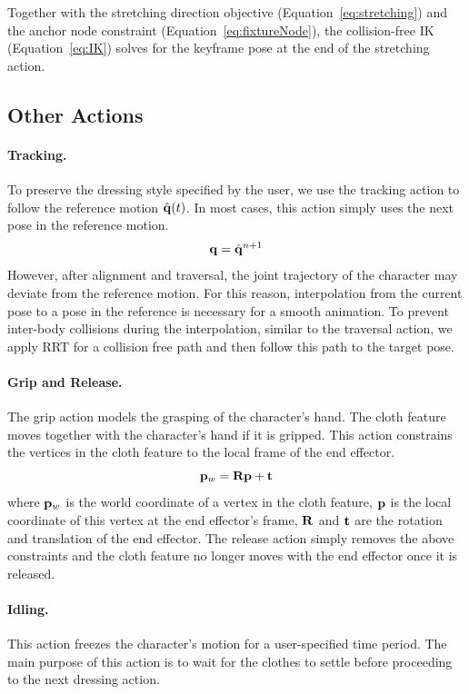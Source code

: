 Together with the stretching direction objective (Equation~\ref{eq:stretching}) and the anchor node constraint (Equation~\ref{eq:fixtureNode}), the collision-free IK (Equation~\ref{eq:IK}) solves for the keyframe pose at the end of the stretching action.

\subsection{Other Actions}

\paragraph{Tracking.} To preserve the dressing style specified by the user, we use the tracking action to follow the reference motion $\hat{\mathbf{q}}(t)$. In most cases, this action simply uses the next pose in the reference motion.
\begin{displaymath}
\mathbf{q} = \hat{\mathbf{q}}^{n+1}
\end{displaymath}
However, after alignment and traversal, the joint trajectory of the character may deviate from the reference motion. For this reason, interpolation from the current pose to a pose in the reference is necessary for a smooth animation. To prevent inter-body collisions during the interpolation, similar to the traversal action, we apply RRT for a collision free path and then follow this path to the target pose.


\paragraph{Grip and Release.}
The grip action models the grasping of the character's hand. The cloth feature moves together with the character's hand if it is gripped. This action constrains the vertices in the cloth feature to the local frame of the end effector.
\begin{displaymath}
\mathbf{p}_w = \mathbf{Rp} + \mathbf{t}
\end{displaymath}
where $\mathbf{p}_w$ is the world coordinate of a vertex in the cloth feature, $\mathbf{p}$ is the local coordinate of this vertex at the end effector's frame, $\mathbf{R}$ and $\mathbf{t}$ are the rotation and translation of the end effector. The release action simply removes the above constraints and the cloth feature no longer moves with the end effector once it is released.

\paragraph{Idling.} This action freezes the character's motion for a user-specified time period. The main purpose of this action is to wait for the clothes to settle before proceeding to the next dressing action.

